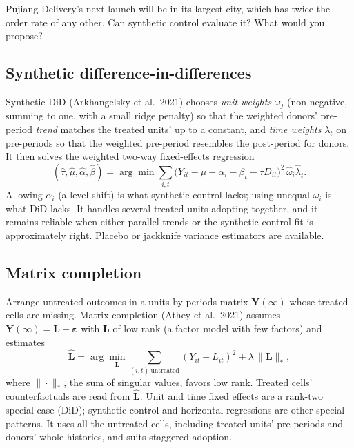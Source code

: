 \documentclass[11pt]{article}
\begin{document}
\begin{exercise}[judgment]
Pujiang Delivery's next launch will be in its largest city, which has twice the order rate of any other. Can synthetic control evaluate it? What would you
propose?
\end{exercise}

\sectionthree

\subsection*{Synthetic difference-in-differences}

Synthetic DiD (Arkhangelsky et al.\ 2021) chooses \emph{unit weights} $\omega_j$ (non-negative, summing to one, with a small ridge penalty) so that the
weighted donors' pre-period \emph{trend} matches the treated units' up to a constant, and \emph{time weights} $\lambda_t$ on pre-periods so that the weighted
pre-period resembles the post-period for donors. It then solves the weighted two-way fixed-effects regression
\[
  (\hat\tau, \hat\mu, \hat\alpha, \hat\beta) = \arg\min \sum_{i,t}\big(Y_{it} - \mu - \alpha_i - \beta_t - \tau D_{it}\big)^2\,\hat\omega_i\hat\lambda_t .
\]
Allowing $\alpha_i$ (a level shift) is what synthetic control lacks; using unequal $\omega_i$ is what DiD lacks. It handles several treated units adopting
together, and it remains reliable when either parallel trends or the synthetic-control fit is approximately right. Placebo or jackknife variance
estimators are available.

\subsection*{Matrix completion}

Arrange untreated outcomes in a units-by-periods matrix $\mathbf Y(\infty)$ whose treated cells are missing. Matrix completion (Athey et al.\ 2021) assumes
$\mathbf Y(\infty) = \mathbf L + \boldsymbol\varepsilon$ with $\mathbf L$ of low rank (a factor model with few factors) and estimates
\[
  \hat{\mathbf L} = \arg\min_{\mathbf L} \sum_{(i,t)\ \text{untreated}} (Y_{it} - L_{it})^2 + \lambda\,\|\mathbf L\|_\ast ,
\]
where $\|\cdot\|_\ast$, the sum of singular values, favors low rank. Treated cells' counterfactuals are read from $\hat{\mathbf L}$. Unit and time fixed effects are a
rank-two special case (DiD); synthetic control and horizontal regressions are other special patterns. It uses all the untreated cells, including
treated units' pre-periods and donors' whole histories, and suits staggered adoption.
\end{document}
